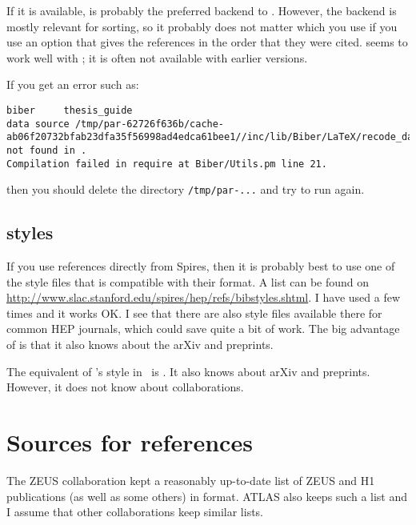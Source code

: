 If it is available,  is probably the preferred backend to
. However, the backend is mostly relevant for
sorting, so it probably does not matter which you use if you use an
option that gives the references in the order that they were
cited.  seems to work well with ; it is
often not available with earlier versions.

If you get an error such as:
{\scriptsize
\begin{verbatim}
biber     thesis_guide
data source /tmp/par-62726f636b/cache-ab06f20732bfab23dfa35f56998ad4edca61bee1//inc/lib/Biber/LaTeX/recode_data.xml not found in .
Compilation failed in require at Biber/Utils.pm line 21.
\end{verbatim}
}
\noindent
then you should delete the directory \texttt{/tmp/par-...} and try to
run again.

\subsection{\BibTeX{} styles}
\label{sec:ref:bst}

If you use references directly from Spires, then it is probably best to
use one of the style files that is compatible with their format. A
list can be found on
\url{http://www.slac.stanford.edu/spires/hep/refs/bibstyles.shtml}. I
have used  a few times and it works OK. I see that there
are also style files available there for common HEP journals, which
could save quite a bit of work. The big advantage of 
is that it also knows about the arXiv and preprints.

The equivalent of 's  style in \BibTeX\ is
. It also knows about arXiv and preprints. However, it
does not know about collaborations.


\section{Sources for references}
\label{sec:ref:sources}

The ZEUS collaboration kept a reasonably up-to-date list of ZEUS and
H1 publications (as well as some others) in \BibTeX{} format. ATLAS
also keeps such a list and I assume that other collaborations keep
similar lists.

